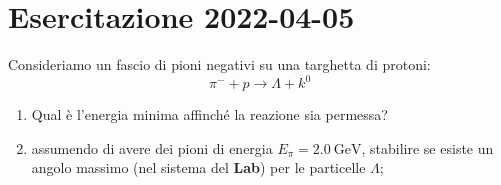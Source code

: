 \chapter{Esercitazione 2022-04-05}
\begin{example}[]
  Consideriamo un fascio di pioni negativi su una targhetta di protoni:
  \begin{equation}
    \pi ^{-} + p \rightarrow \Lambda + k^0
  \end{equation}
  \begin{enumerate}
    \item Qual è l'energia minima affinché la reazione sia permessa?
    \item assumendo di avere dei pioni di energia $E _{\pi} = \qty{2.0}{\GeV}$,
      stabilire se esiste un angolo massimo (nel sistema del \textbf{Lab}) per
      le particelle $\Lambda$;
  \end{enumerate}


\end{example}
